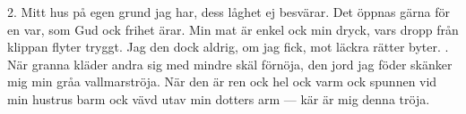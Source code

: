 \setlength{\columnsep}{1cm}
\begin{multicols}{2}
2.  Mitt hus på egen grund jag har,
    dess låghet ej besvärar.
    Det öppnas gärna för en var,
    som Gud ock frihet ärar.
    Min mat är enkel ock min dryck,
    vars dropp från klippan flyter tryggt.
    Jag den dock aldrig, om jag fick,
    mot läckra rätter byter.
\vfill{}.  När granna kläder andra sig
    med mindre skäl förnöja,
    den jord jag föder skänker mig
    min gråa vallmarströja.
    När den är ren ock hel ock varm
    ock spunnen vid min hustrus barm
    ock vävd utav min dotters arm —
    kär är mig denna tröja.
\end{multicols}
